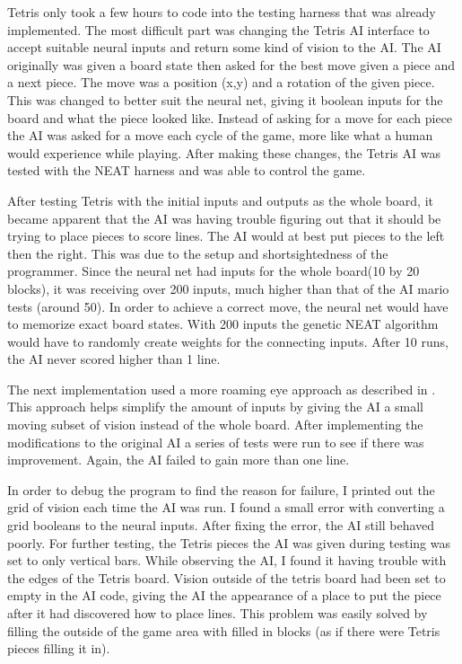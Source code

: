 \documentclass[12pt]{ucthesis} \newif\ifpdf \ifx\pdfoutput\undefined
\begin{document}
Tetris only took a few hours to code into the testing harness that was already
implemented. The most difficult part was changing the Tetris AI interface to
accept suitable neural inputs and return some kind of vision to the AI. The AI
originally was given a board state then asked for the best move given a piece
and a next piece. The move was a position (x,y) and a rotation of the given
piece. This was changed to better suit the neural net, giving it boolean inputs
for the board and what the piece looked like. Instead of asking for a move for
each piece the AI was asked for a move each cycle of the game, more like what a
human would experience while playing. After making these changes, the Tetris AI
was tested with the NEAT harness and was able to control the game.

After testing Tetris with the initial inputs and outputs as the whole board, it
became apparent that the AI was having trouble figuring out that it should be
trying to place pieces to score lines. The AI would at best put pieces to the
left then the right. This was due to the setup and shortsightedness of the
programmer. Since the neural net had inputs for the whole board(10 by 20
blocks), it was receiving over 200 inputs, much higher than that of the AI mario
tests (around 50). In order to achieve a correct move, the neural net would have
to memorize exact board states. With 200 inputs the genetic NEAT algorithm would
have to randomly create weights for the connecting inputs. After 10 runs, the AI
never scored higher than 1 line.

The next implementation used a more roaming eye approach as described in
\cite{stanley:phd04}. This approach helps simplify the amount of inputs by
giving the AI a small moving subset of vision instead of the whole board. After
implementing the modifications to the original AI a series of tests were run to
see if there was improvement. Again, the AI failed to gain more than one line.

In order to debug the program to find the reason for failure, I printed out the
grid of vision each time the AI was run. I found a small error with converting a
grid booleans to the neural inputs. After fixing the error, the AI still behaved
poorly. For further testing, the Tetris pieces the AI was given during testing
was set to only vertical bars. While observing the AI, I found it having trouble
with the edges of the Tetris board. Vision outside of the tetris board had been
set to empty in the AI code, giving the AI the appearance of a place to put the
piece after it had discovered how to place lines. This problem was easily solved
by filling the outside of the game area with filled in blocks (as if there were
Tetris pieces filling it in).
\end{document}
